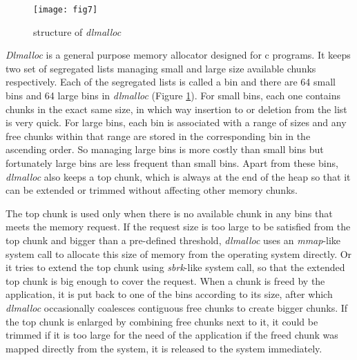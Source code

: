 \begin{figure}[htbp]
\centering
\texttt{[image: fig7]}
\caption{structure of \emph{dlmalloc}}\label{fig_7}
\end{figure}

\emph{Dlmalloc} is a general purpose memory allocator designed for c programs. It keeps two set of segregated lists managing small and large size available chunks respectively. Each of the segregated lists is called a bin and there are 64 small bins and 64 large bins in \emph{dlmalloc} (Figure \ref{fig_7}). For small bins, each one contains chunks in the exact same size, in which way insertion to or deletion from the list is very quick. For large bins, each bin is associated with a range of sizes and any free chunks within that range are stored in the corresponding bin in the ascending order. So managing large bins is more costly than small bins but fortunately large bins are less frequent than small bins. Apart from these bins, \emph{dlmalloc} also keeps a top chunk, which is always at the end of the heap so that it can be extended or trimmed without affecting other memory chunks. 

The top chunk is used only when there is no available chunk in any bins that meets the memory request. If the request size is too large to be satisfied from the top chunk and bigger than a pre-defined threshold, \emph{dlmalloc} uses an \emph{mmap}-like system call to allocate this size of memory from the operating system directly. Or it tries to extend the top chunk using \emph{sbrk}-like system call, so that the extended top chunk is big enough to cover the request.
When a chunk is freed by the application, it is put back to one of the bins according to its size, after which \emph{dlmalloc} occasionally coalesces contiguous free chunks to create bigger chunks. If the top chunk is enlarged by combining free chunks next to it, it could be trimmed if it is too large for the need of the application if the freed chunk was mapped directly from the system, it is released to the system immediately. 

